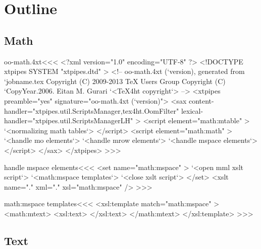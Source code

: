 \documentclass{article}
\begin{document}





\section{Outline}


\subsection{Math}








\<oo-math.4xt\><<<
<?xml version="1.0" encoding="UTF-8" ?>
<!DOCTYPE xtpipes SYSTEM "xtpipes.dtd" >
<!-- oo-math.4xt (`version), generated from `jobname.tex
     Copyright (C) 2009-2013 TeX Users Group
     Copyright (C) `CopyYear.2006. Eitan M. Gurari
`<TeX4ht copyright`> -->
<xtpipes preamble="yes" signature="oo-math.4xt (`version)">
   <sax content-handler="xtpipes.util.ScriptsManager,tex4ht.OomFilter" 
        lexical-handler="xtpipes.util.ScriptsManagerLH" >
      <script element="math:mtable" >
         `<normalizing math tables`>
      </script> 
      <script element="math:math" >
         `<handle mo elements`>
         `<handle mrow elements`>
         `<handle mspace elements`>
      </script> 
   </sax>
</xtpipes>
>>>







\<handle mspace elements\><<<
<set name="math:mspace" >
   `<open mml xslt script`>
   `<math:mspace templates`>
   `<close xslt script`>
</set>
<xslt name="." xml="." xsl="math:mspace" />
>>>


\<math:mspace templates\><<<
<xsl:template match="math:mspace" >
  <math:mtext>  
     <xsl:text> </xsl:text>
  </math:mtext>
</xsl:template> 
>>>




\subsection{Text}
\end{document}
